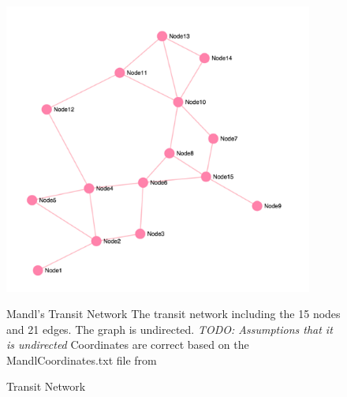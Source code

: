 \begin{figure}[H]
\begin{center}
  \includegraphics[width=4in]{assets/mandlnetwork_crop.png}
  \end{center}
  \caption{Transit Network}
  \label{fig:MandlNetwork} 
   {Mandl's Transit Network} 
   The transit network including the 15 nodes and 21 edges. The graph is undirected. \emph{\color{red} TODO: Assumptions that it is undirected} Coordinates are correct based on the MandlCoordinates.txt file from \citep{mumford13}
\end{figure}